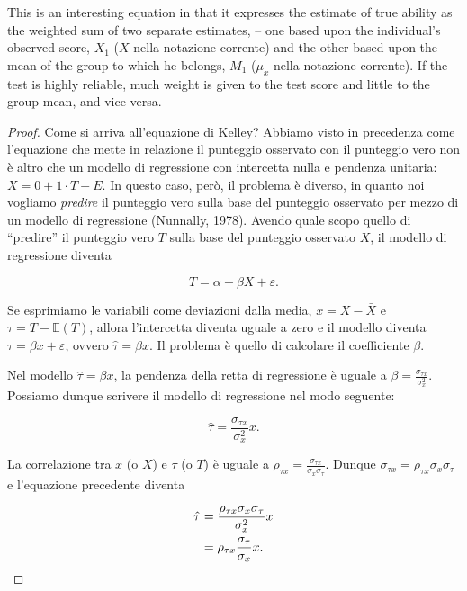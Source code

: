 \documentclass[
  11pt,
]{krantz}
\newcommand{\E}{\mathbb{E}} %
\theoremstyle{definition}
\theoremstyle{definition}
\theoremstyle{definition}
\theoremstyle{definition}
\theoremstyle{remark}
\begin{document}
This is an interesting equation in that it expresses the estimate of true ability as the weighted sum of two separate estimates, -- one based upon the individual's observed score, \(X_1\) (\(X\) nella notazione corrente) and the other based upon the mean of the group to which he belongs, \(M_1\) (\(\mu_x\) nella notazione corrente). If the test is highly reliable, much weight is given to the test score and little to the group mean, and vice versa.

\begin{proof}
Come si arriva all'equazione di Kelley? Abbiamo visto in precedenza come l'equazione che mette in relazione il punteggio osservato con il punteggio vero non è altro che un modello di regressione con intercetta nulla e pendenza unitaria: \(X = 0 + 1 \cdot T + E\). In questo caso, però, il problema è diverso, in quanto noi vogliamo \emph{predire} il punteggio vero sulla base del punteggio osservato per mezzo di un modello di regressione (Nunnally, 1978). Avendo quale scopo quello di ``predire'' il punteggio vero \(T\) sulla base del punteggio osservato \(X\), il modello di regressione diventa

\[
T = \alpha + \beta X + \varepsilon.
\]

Se esprimiamo le variabili come deviazioni dalla media, \(x = X - \bar{X}\) e \(\tau = T - \E(T)\), allora l'intercetta diventa uguale a zero e il modello diventa \(\tau = \beta x + \varepsilon\), ovvero \(\hat{\tau} = \beta x.\) Il problema è quello di calcolare il coefficiente \(\beta\).

Nel modello \(\hat{\tau} = \beta x\), la pendenza della retta di regressione è uguale a \(\beta = \frac{\sigma_{\tau x}}{\sigma^2_x}\). Possiamo dunque scrivere il modello di regressione nel modo seguente:

\begin{equation}
\hat{\tau} = \frac{\sigma_{\tau x}}{\sigma^2_x} x.
\label{eq:hat-t-1}
\end{equation}

La correlazione tra \(x\) (o \(X\)) e \(\tau\) (o \(T\)) è uguale a \(\rho_{\tau x} = \frac{\sigma_{\tau x}}{\sigma_x \sigma_{\tau}}\). Dunque \(\sigma_{\tau x} = \rho_{\tau x}\sigma_x \sigma_{\tau}\) e l'equazione precedente diventa

\begin{equation}
\begin{aligned}
\hat{\tau} %
&= \frac{\rho_{\tau x}\sigma_x \sigma_{\tau}}{\sigma^2_x} x  \notag\\
&= \rho_{\tau x}\frac{\sigma_{\tau}}{\sigma_x} x. \notag
\label{eq:hat-t-2}
\end{aligned}
\end{equation}


\end{proof}
\end{document}
